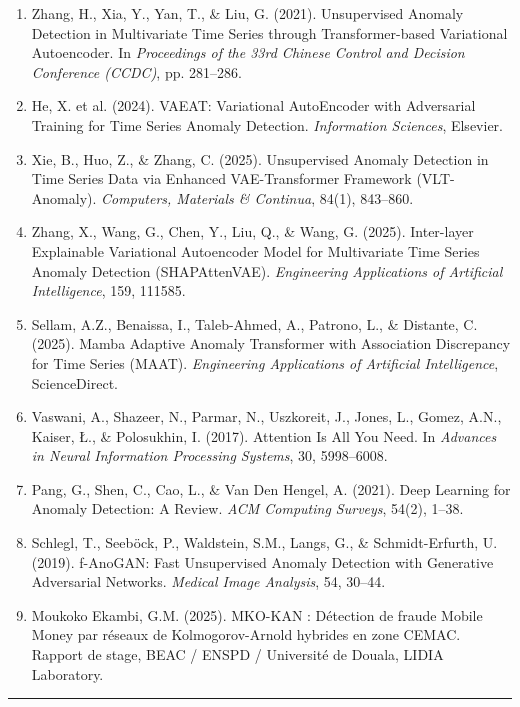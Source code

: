 \documentclass[12pt,a4paper]{article}
\begin{document}
\begin{enumerate}
\item[\lbrack H4\rbrack] Zhang, H., Xia, Y., Yan, T., \& Liu, G. (2021). Unsupervised Anomaly Detection in Multivariate Time Series through Transformer-based Variational Autoencoder. In \textit{Proceedings of the 33rd Chinese Control and Decision Conference (CCDC)}, pp. 281--286.

\item[\lbrack A1\rbrack] He, X. et al. (2024). VAEAT: Variational AutoEncoder with Adversarial Training for Time Series Anomaly Detection. \textit{Information Sciences}, Elsevier.

\item[\lbrack A2\rbrack] Xie, B., Huo, Z., \& Zhang, C. (2025). Unsupervised Anomaly Detection in Time Series Data via Enhanced VAE-Transformer Framework (VLT-Anomaly). \textit{Computers, Materials \& Continua}, 84(1), 843--860.

\item[\lbrack A3\rbrack] Zhang, X., Wang, G., Chen, Y., Liu, Q., \& Wang, G. (2025). Inter-layer Explainable Variational Autoencoder Model for Multivariate Time Series Anomaly Detection (SHAPAttenVAE). \textit{Engineering Applications of Artificial Intelligence}, 159, 111585.

\item[\lbrack A4\rbrack] Sellam, A.Z., Benaissa, I., Taleb-Ahmed, A., Patrono, L., \& Distante, C. (2025). Mamba Adaptive Anomaly Transformer with Association Discrepancy for Time Series (MAAT). \textit{Engineering Applications of Artificial Intelligence}, ScienceDirect.

\item[] Vaswani, A., Shazeer, N., Parmar, N., Uszkoreit, J., Jones, L., Gomez, A.N., Kaiser, \L., \& Polosukhin, I. (2017). Attention Is All You Need. In \textit{Advances in Neural Information Processing Systems}, 30, 5998--6008.

\item[] Pang, G., Shen, C., Cao, L., \& Van Den Hengel, A. (2021). Deep Learning for Anomaly Detection: A Review. \textit{ACM Computing Surveys}, 54(2), 1--38.

\item[] Schlegl, T., Seeb{\"o}ck, P., Waldstein, S.M., Langs, G., \& Schmidt-Erfurth, U. (2019). f-AnoGAN: Fast Unsupervised Anomaly Detection with Generative Adversarial Networks. \textit{Medical Image Analysis}, 54, 30--44.

\item[] Moukoko Ekambi, G.M. (2025). MKO-KAN : Détection de fraude Mobile Money par réseaux de Kolmogorov-Arnold hybrides en zone CEMAC. Rapport de stage, BEAC / ENSPD / Université de Douala, LIDIA Laboratory.
\end{enumerate}

\vspace{2cm}
\hrule
\vspace{0.5cm}
\end{document}
